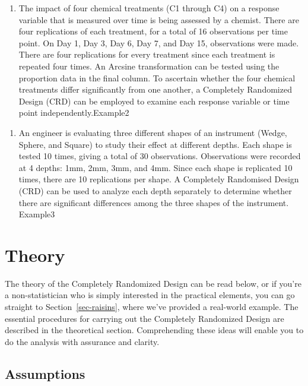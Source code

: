 \documentclass[
  letterpaper,
  DIV=11,
  numbers=noendperiod]{scrartcl}
\providecommand{\tightlist}{%
  \setlength{\itemsep}{0pt}\setlength{\parskip}{0pt}}\usepackage{longtable,booktabs,array}
\begin{document}
\begin{enumerate}
\def\labelenumi{\arabic{enumi}.}
\setcounter{enumi}{1}
\tightlist
\item
  The impact of four chemical treatments (C1 through C4) on a response
  variable that is measured over time is being assessed by a chemist.
  There are four replications of each treatment, for a total of 16
  observations per time point. On Day 1, Day 3, Day 6, Day 7, and Day
  15, observations were made. There are four replications for every
  treatment since each treatment is repeated four times. An Arcsine
  transformation can be tested using the proportion data in the final
  column. To ascertain whether the four chemical treatments differ
  significantly from one another, a Completely Randomized Design (CRD)
  can be employed to examine each response variable or time point
  independently.Example2
\end{enumerate}

\begin{enumerate}
\def\labelenumi{\arabic{enumi}.}
\setcounter{enumi}{2}
\tightlist
\item
  An engineer is evaluating three different shapes of an instrument
  (Wedge, Sphere, and Square) to study their effect at different depths.
  Each shape is tested 10 times, giving a total of 30 observations.
  Observations were recorded at 4 depths: 1mm, 2mm, 3mm, and 4mm. Since
  each shape is replicated 10 times, there are 10 replications per
  shape. A Completely Randomised Design (CRD) can be used to analyze
  each depth separately to determine whether there are significant
  differences among the three shapes of the instrument. Example3
\end{enumerate}

\hypertarget{sec-theory}{%
\section{Theory}\label{sec-theory}}

The theory of the Completely Randomized Design can be read below, or if
you're a non-statistician who is simply interested in the practical
elements, you can go straight to Section~\ref{sec-raisins}, where we've
provided a real-world example. The essential procedures for carrying out
the Completely Randomized Design are described in the theoretical
section. Comprehending these ideas will enable you to do the analysis
with assurance and clarity.

\hypertarget{sec-assumptions}{%
\subsection{Assumptions}\label{sec-assumptions}}
\end{document}
